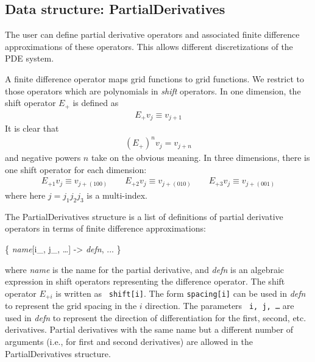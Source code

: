 \documentclass{report}
\begin{document}
\subsection{Data structure: PartialDerivatives}

The user can define partial derivative operators and associated finite
difference approximations of these operators.  This allows different
discretizations of the PDE system.

A finite difference operator maps grid functions to grid functions.
We restrict to those operators which are polynomials in {\em shift}
operators.  In one dimension, the shift operator $E_+$ is defined as 
\begin{eqnarray}
E_+ v_j \equiv v_{j+1}
\end{eqnarray}
It is clear that
\begin{eqnarray}
(E_+)^n v_j = v_{j+n}
\end{eqnarray}
and negative powers $n$ take on the obvious meaning.  In three
dimensions, there is one shift operator for each dimension:
\begin{eqnarray}
E_{+1} v_j \equiv v_{j+(100)} \qquad
E_{+2} v_j \equiv v_{j+(010)} \qquad
E_{+3} v_j \equiv v_{j+(001)}
\end{eqnarray}
where here $j = j_1 j_2 j_3$ is a multi-index.

The PartialDerivatives structure is a list of definitions of partial
derivative operators in terms of finite difference approximations:

\begin{center}
\begin{minipage}{0.8 \textwidth}
\begin{tt}
\{  {\it name}[i\_, j\_, \ldots] -> {\it defn}, ...  \}
\end{tt}
\end{minipage}
\end{center}

where {\it name} is the name for the partial derivative, and {\it
defn} is an algebraic expression in shift operators representing the
difference operator.  The shift operator $E_{+i}$ is written as {\tt
shift[i]}.  The form {\tt spacing[i]} can be used in {\it defn} to
represent the grid spacing in the $i$ direction.  The parameters {\tt
i, j, \ldots} are used in {\it defn} to represent the direction of
differentiation for the first, second, etc.  derivatives.  Partial
derivatives with the same name but a different number of arguments
(i.e., for first and second derivatives) are allowed in the
PartialDerivatives structure.
\end{document}
